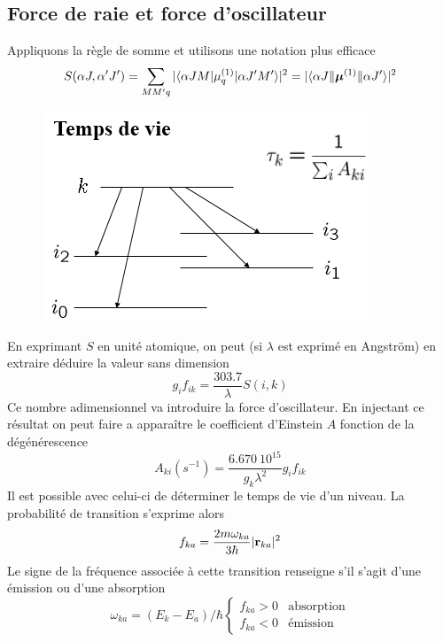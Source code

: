 \subsection{Force de raie et force d'oscillateur}
Appliquons la règle de somme et utilisons une notation plus efficace
\begin{equation}
S(\alpha J, \alpha' J' ) = \sum_{MM'q} \vert \langle \alpha JM \vert \mu^{(1)}_q  \vert \alpha J' M' \rangle \vert^2= 
\vert \langle \alpha J \Vert 
\mbox{\boldmath $ \mu $}^{(1)} \Vert \alpha J' \rangle \vert^2
\end{equation}


	\begin{figure}
	\vspace{-5mm}
	\includegraphics[scale=0.55]{ch2/image3}
	\end{figure}

En exprimant $S$ en unité atomique, on peut (si $\lambda$ est exprimé en Angström) en extraire déduire
la valeur sans dimension
\begin{equation}
g_i f_{ik} = \frac{303.7}{\lambda} S(i,k)
\end{equation}
Ce nombre adimensionnel va introduire la force d'oscillateur. En injectant ce résultat on peut faire a
apparaître le coefficient d'Einstein $A$ fonction de la dégénérescence
\begin{equation}
A_{ki} (s^{-1}) = \frac{6.670~10^{15}}{g_k \lambda^2} g_i f_{ik}
\end{equation}
Il est possible avec celui-ci de déterminer le temps de vie d'un niveau. La probabilité de transition
s'exprime alors
\begin{equation}
f_{ka} =  \frac{2 m \omega_{ka}}{3 \hbar} \vert {\bf r}_{ka} \vert^2
\end{equation}
Le signe de la fréquence associée à cette transition renseigne s'il s'agit d'une émission ou d'une
absorption
\begin{equation}
\omega_{ka} = (E_k - E_a)/ \hbar 
\left\{ \begin{array}{ll} 
f_{ka} > 0 & \mbox{absorption} \\
f_{ka} < 0 & \mbox{\'emission} \end{array} \right.
\end{equation}

